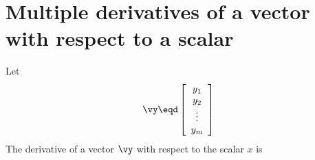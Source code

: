 \section{Multiple derivatives of a vector with respect to a scalar}
\begin{definition}
Let 
\[
   \vy \eqd
   \left[\begin{array}{c}
     y_1    \\
     y_2    \\
     \vdots \\
     y_m
   \end{array}\right]
\]
The derivative of a vector $\vy$ with respect to the scalar $x$ is
\end{definition}
